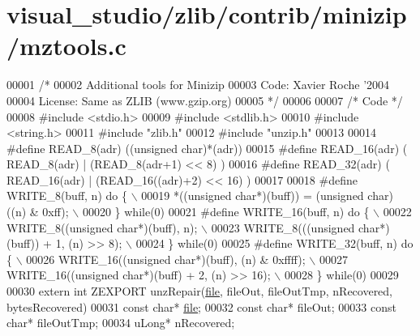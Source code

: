 \hypertarget{visual__studio_2zlib_2contrib_2minizip_2mztools_8c_source}{}\section{visual\+\_\+studio/zlib/contrib/minizip/mztools.c}
\label{visual__studio_2zlib_2contrib_2minizip_2mztools_8c_source}

\begin{DoxyCode}
00001 \textcolor{comment}{/*}
00002 \textcolor{comment}{  Additional tools for Minizip}
00003 \textcolor{comment}{  Code: Xavier Roche '2004}
00004 \textcolor{comment}{  License: Same as ZLIB (www.gzip.org)}
00005 \textcolor{comment}{*/}
00006 
00007 \textcolor{comment}{/* Code */}
00008 \textcolor{preprocessor}{#include <stdio.h>}
00009 \textcolor{preprocessor}{#include <stdlib.h>}
00010 \textcolor{preprocessor}{#include <string.h>}
00011 \textcolor{preprocessor}{#include "zlib.h"}
00012 \textcolor{preprocessor}{#include "unzip.h"}
00013 
00014 \textcolor{preprocessor}{#define READ\_8(adr)  ((unsigned char)*(adr))}
00015 \textcolor{preprocessor}{#define READ\_16(adr) ( READ\_8(adr) | (READ\_8(adr+1) << 8) )}
00016 \textcolor{preprocessor}{#define READ\_32(adr) ( READ\_16(adr) | (READ\_16((adr)+2) << 16) )}
00017 
00018 \textcolor{preprocessor}{#define WRITE\_8(buff, n) do \{ \(\backslash\)}
00019 \textcolor{preprocessor}{  *((unsigned char*)(buff)) = (unsigned char) ((n) & 0xff); \(\backslash\)}
00020 \textcolor{preprocessor}{\} while(0)}
00021 \textcolor{preprocessor}{#define WRITE\_16(buff, n) do \{ \(\backslash\)}
00022 \textcolor{preprocessor}{  WRITE\_8((unsigned char*)(buff), n); \(\backslash\)}
00023 \textcolor{preprocessor}{  WRITE\_8(((unsigned char*)(buff)) + 1, (n) >> 8); \(\backslash\)}
00024 \textcolor{preprocessor}{\} while(0)}
00025 \textcolor{preprocessor}{#define WRITE\_32(buff, n) do \{ \(\backslash\)}
00026 \textcolor{preprocessor}{  WRITE\_16((unsigned char*)(buff), (n) & 0xffff); \(\backslash\)}
00027 \textcolor{preprocessor}{  WRITE\_16((unsigned char*)(buff) + 2, (n) >> 16); \(\backslash\)}
00028 \textcolor{preprocessor}{\} while(0)}
00029 
00030 \textcolor{keyword}{extern} \textcolor{keywordtype}{int} ZEXPORT unzRepair(\hyperlink{structfile}{file}, fileOut, fileOutTmp, nRecovered, bytesRecovered)
00031 \textcolor{keyword}{const} \textcolor{keywordtype}{char}* \hyperlink{structfile}{file};
00032 \textcolor{keyword}{const} \textcolor{keywordtype}{char}* fileOut;
00033 \textcolor{keyword}{const} \textcolor{keywordtype}{char}* fileOutTmp;
00034 uLong* nRecovered;

\end{DoxyCode}
